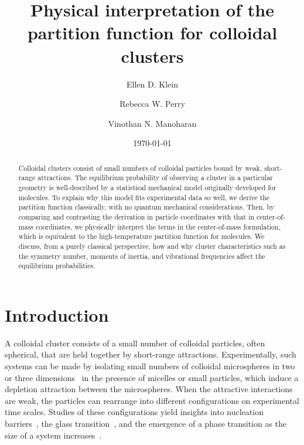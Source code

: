 \documentclass[pre, aps, twocolumn, reprint, amsmath,amssymb, showpacs,
superscriptaddress] {revtex4-1}
\begin{document}
\title{Physical interpretation of the partition function for colloidal clusters}
\date{\today}
\author{Ellen D. Klein}
\author{Rebecca W. Perry}
\author{Vinothan N. Manoharan}%

\begin{abstract}\label{sec:abstract}
  Colloidal clusters consist of small numbers of colloidal particles
  bound by weak, short-range attractions. The equilibrium probability of
  observing a cluster in a particular geometry is well-described by a
  statistical mechanical model originally developed for molecules. To
  explain why this model fits experimental data so well, we derive the
  partition function classically, with no quantum mechanical
  considerations. Then, by comparing and contrasting the derivation in
  particle coordinates with that in center-of-mass coordinates, we
  physically interpret the terms in the center-of-mass formulation,
  which is equivalent to the high-temperature partition function for
  molecules. We discuss, from a purely classical perspective, how and
  why cluster characteristics such as the symmetry number, moments of
  inertia, and vibrational frequencies affect the equilibrium
  probabilities.
\end{abstract}

\maketitle

\section{Introduction\label{sec:introduction}}
A colloidal cluster consists of a small number of colloidal particles,
often spherical, that are held together by short-range attractions.
Experimentally, such systems can be made by isolating small numbers of
colloidal microspheres in two~\cite{perry_two-dimensional_2015,
  perry_segregation_2016} or three dimensions~\cite{meng10, perry12} in
the presence of micelles or small particles, which induce a depletion
attraction \cite{asakura54, vrij76, lekkerkerker11} between the
microspheres. When the attractive interactions are weak, the particles
can rearrange into different configurations on experimental time scales.
Studies of these configurations yield insights into nucleation
barriers~\cite{hoy12, perry12}, the glass
transition~\cite{yunker_relationship_2013, hoy15}, and the emergence of
a phase transition as the size of a system increases~\cite{perry12,
  calvo12}.
\end{document}
